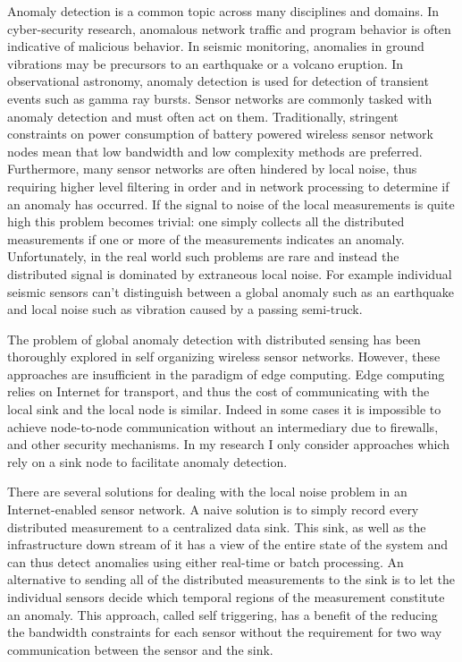 Anomaly detection is a common topic across many disciplines and domains.
In cyber-security research, anomalous network traffic and program behavior is often indicative of malicious behavior.
In seismic monitoring, anomalies in ground vibrations may be precursors to an earthquake or a volcano eruption.
In observational astronomy, anomaly detection is used for detection of transient events such as gamma ray bursts.
Sensor networks are commonly tasked with anomaly detection and must often act on them.
Traditionally, stringent constraints on power consumption of battery powered wireless sensor network nodes mean that low bandwidth and low complexity methods are preferred.
Furthermore, many sensor networks are often hindered by local noise, thus requiring higher level filtering in order and in network processing to determine if an anomaly has occurred.
If the signal to noise of the local measurements is quite high this problem becomes trivial: one simply collects all the distributed measurements if one or more of the measurements indicates an anomaly.
Unfortunately, in the real world such problems are rare and instead the distributed signal is dominated by extraneous local noise.
For example individual seismic sensors can't distinguish between a global anomaly such as an earthquake and local noise such as vibration caused by a passing semi-truck.


The problem of global anomaly detection with distributed sensing has been thoroughly explored in self organizing wireless sensor networks.
However, these approaches are insufficient in the paradigm of edge computing.
Edge computing relies on Internet for transport, and thus the cost of communicating with the local sink and the local node is similar.
Indeed in some cases it is impossible to achieve node-to-node communication without an intermediary due to firewalls, and other security mechanisms.
In my research I only consider approaches which rely on a sink node to facilitate anomaly detection.

There are several solutions for dealing with the local noise problem in an Internet-enabled sensor network.
A naive solution is to simply record every distributed measurement to a centralized data sink.
This sink, as well as the infrastructure down stream of it has a view of the entire state of the system and can thus detect anomalies using either real-time or batch processing.
An alternative to sending all of the distributed measurements to the sink is to let the individual sensors decide which temporal regions of the measurement constitute an anomaly.
This approach, called self triggering, has a benefit of the reducing the bandwidth constraints for each sensor without the requirement for two way communication between the sensor and the sink.

